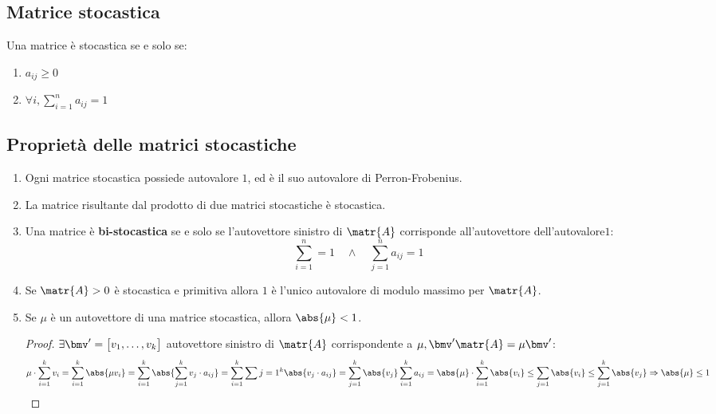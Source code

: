 \documentclass[\main/main.tex]{subfiles}
\begin{document}
\subsection{Matrice stocastica}
Una matrice è stocastica se e solo se:
\begin{enumerate}
  \item \(a_{ij} \geq 0\)
  \item \(\forall i, \sum_{i=1}^n a_{ij} = 1\)
\end{enumerate}

\subsection{Proprietà delle matrici stocastiche}
\begin{enumerate}
  \item Ogni matrice stocastica possiede autovalore \(1\), ed è il suo autovalore di
        Perron-Frobenius.
  \item La matrice risultante dal prodotto di due matrici stocastiche è stocastica.
  \item Una matrice è \textbf{bi-stocastica} se e solo se l'autovettore sinistro di \(\matr{A}\) corrisponde all'autovettore dell'autovalore\(1\):
        \[
          \sum_{i=1}^n = 1 \quad \land \quad \sum_{j=1}^n a_{ij} = 1
        \]
  \item Se \(\matr{A} > 0\) è stocastica e primitiva allora \(1\) è l'unico autovalore di modulo massimo per \(\matr{A}\).
  \item Se \(\mu \) è un autovettore di una matrice stocastica, allora \(\abs{\mu} < 1\).
        \begin{proof}
          \(\exists \bmv' = \begin{bmatrix}
            v_1, \ldots, v_k
          \end{bmatrix}\) autovettore sinistro di \(\matr{A}\) corrispondente a \(\mu, \bmv' \matr{A} = \mu \bmv'\):
          \[
            \mu \cdot \sum_{i=1}^k v_i = \sum_{i=1}^k \abs{\mu v_i} = \sum_{i=1}^k \abs{\sum_{j=1}^k v_j\cdot a_{ij}} = \sum_{i=1}^k \sum{j=1}^k \abs{v_j \cdot a_{ij}} = \sum_{j=1}^k \abs{v_j} \sum_{i=1}^k a_{ij} = \abs{\mu} \cdot \sum_{i=1}^k \abs{v_i} \leq \sum_{j=1} \abs{v_i} \leq \sum_{j=1}^k \abs{v_j} \Rightarrow \abs{\mu} \leq 1
          \]
        \end{proof}
\end{enumerate}
\end{document}
